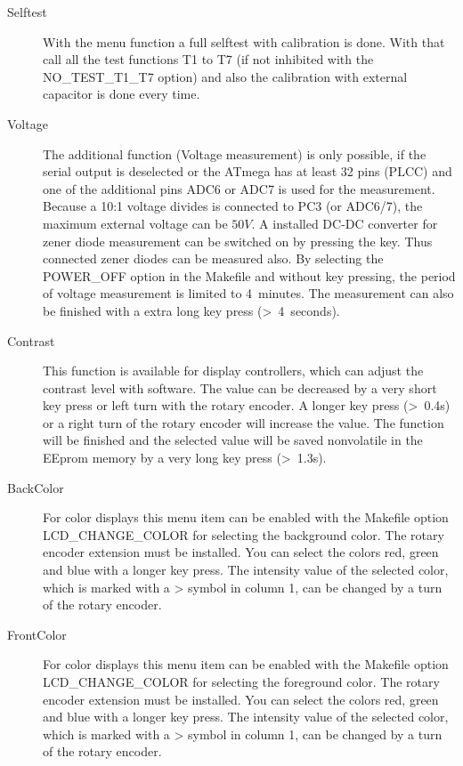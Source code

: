 \begin{description}
\item[Selftest]
With the menu function  a full selftest with calibration is done.
With that call all the test functions T1 to T7 (if not inhibited with the NO\_TEST\_T1\_T7 option) 
and also the calibration with external capacitor is done every time.\\

\item[Voltage]
The additional function  (Voltage measurement) is only possible, if the serial output is deselected
or the ATmega has at least 32 pins (PLCC) and one of the additional pins ADC6 or ADC7 is used for the measurement.
Because a 10:1 voltage divides is connected to PC3 (or ADC6/7), the maximum external voltage can be \(50V\).
A installed DC-DC converter for zener diode measurement can be switched on by pressing the key.
Thus connected zener diodes can be measured also.
By selecting the POWER\_OFF option in the Makefile and without key pressing, the period of voltage measurement is limited to 4~minutes.
The measurement can also be finished with a extra long key press (\textgreater~4~seconds).

\item[Contrast] 
This function is available for display controllers, which can adjust the contrast level with software.
The value can be decreased by a very short key press or left turn with the rotary encoder.
A longer key press (\textgreater~0.4s) or a right turn of the rotary encoder will increase the value.
The function will be finished and the selected value will be saved nonvolatile in the EEprom memory 
by a very long key press (\textgreater~1.3s).

\item[BackColor]
For color displays this menu item can be enabled with the Makefile option LCD\_CHANGE\_COLOR 
for selecting the background color. The rotary encoder extension must be installed.
You can select the colors red, green and blue with a longer key press. The intensity value of the
selected color, which is marked with a {\textgreater} symbol in column 1, can be changed by a turn of the rotary encoder.

\item[FrontColor]
For color displays this menu item can be enabled with the Makefile option LCD\_CHANGE\_COLOR 
for selecting the foreground color. The rotary encoder extension must be installed.
You can select the colors red, green and blue with a longer key press. The intensity value of the
selected color, which is marked with a {\textgreater} symbol in column 1, can be changed by a turn of the rotary encoder.


\end{description}
